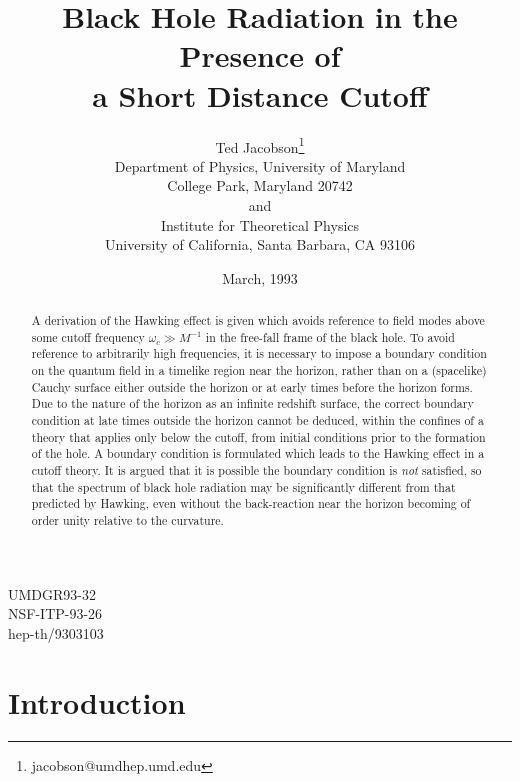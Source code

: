 \documentclass[12pt]{article}
\begin{document}
\title{\Large Black Hole Radiation in the Presence of \\a Short Distance
Cutoff}%
\author{\large Ted Jacobson\thanks{jacobson@umdhep.umd.edu}\\
Department of Physics, University of Maryland\\
College Park, Maryland 20742\\
and\\
Institute for Theoretical Physics\\
University of California, Santa Barbara, CA 93106}
\date{March, 1993}
\maketitle

\vspace{-11cm}
\begin{flushright}
UMDGR93-32\\NSF-ITP-93-26\\hep-th/9303103
\end{flushright}
\vspace{9cm}

\begin{abstract}
A derivation of the Hawking effect is given which avoids
reference to field modes above some cutoff frequency
$\omega_c\gg M^{-1}$ in the free-fall frame of the black
hole. To avoid reference to arbitrarily high frequencies, it
is necessary to impose a boundary condition on the quantum
field in a timelike region near the horizon, rather than on
a (spacelike) Cauchy surface either outside the horizon or
at early times before the horizon forms. Due to the nature
of the horizon as an infinite redshift surface, the correct
boundary condition at late times outside the horizon cannot
be deduced, within the confines of a theory that applies only
below the cutoff, from initial conditions prior to the formation of
the hole. A boundary condition is formulated which leads to the
Hawking effect in a cutoff theory.
It is argued that it is possible the
boundary condition is {\it not} satisfied, so that the
spectrum of black hole radiation may be significantly
different from that predicted by Hawking, even without the
back-reaction near the horizon becoming of order unity relative
to the curvature.
\end{abstract}

\newpage

\section{Introduction}
\label{sec:1}
\end{document}
